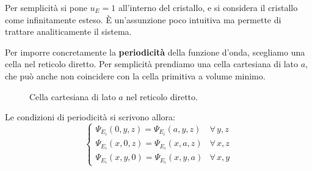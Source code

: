 \begin{remark}
Per semplicità si pone \(u_E = 1\) all'interno del cristallo, e si considera il cristallo come infinitamente esteso. È un'assunzione poco intuitiva ma permette di trattare analiticamente il sistema.
\end{remark}

Per imporre concretamente la \textbf{periodicità} della funzione d'onda, scegliamo una cella nel reticolo diretto. Per semplicità prendiamo una cella cartesiana di lato \(a\), che può anche non coincidere con la cella primitiva a volume minimo.

\begin{figure}[htbp]
    \centering
    \caption{Cella cartesiana di lato \(a\) nel reticolo diretto.}
    \label{fig:cella_cartesiana}
\end{figure}

Le condizioni di periodicità si scrivono allora:
\begin{equation}
    \begin{cases}
        \Psi_{E_i}(0, y, z) = \Psi_{E_i}(a, y, z) & \forall\, y, z \\
        \Psi_{E_i}(x, 0, z) = \Psi_{E_i}(x, a, z) & \forall\, x, z \\
        \Psi_{E_i}(x, y, 0) = \Psi_{E_i}(x, y, a) & \forall\, x, y
    \end{cases}
\end{equation}

